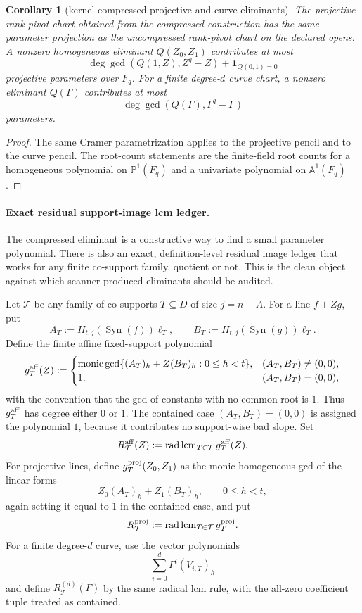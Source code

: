 \documentclass[11pt]{article}
\newtheorem{corollary}[corollary]{Corollary}
\theoremstyle{definition}
\theoremstyle{remark}
\newcommand{\Syn}{\operatorname{Syn}}
\begin{document}
\begin{corollary}[kernel-compressed projective and curve eliminants]
\label{cor:kernel-compressed-projective-curve-eliminants}
The projective rank-pivot chart obtained from the compressed construction has the
same parameter projection as the uncompressed rank-pivot chart on the declared
opens.  A nonzero homogeneous eliminant $Q(Z_0,Z_1)$ contributes at most
\[
        \deg\gcd(Q(1,Z),Z^q-Z)+\mathbf 1_{Q(0,1)=0}
\]
projective parameters over $F_q$.  For a finite degree-$d$ curve chart, a nonzero
eliminant $Q(\Gamma)$ contributes at most
\[
        \deg\gcd(Q(\Gamma),\Gamma^q-\Gamma)
\]
parameters.
\end{corollary}

\begin{proof}
The same Cramer parametrization applies to the projective pencil and to the
curve pencil.  The root-count statements are the finite-field root counts for a
homogeneous polynomial on $\mathbb P^1(F_q)$ and a univariate polynomial on
$\mathbb A^1(F_q)$.
\end{proof}

\paragraph{Exact residual support-image lcm ledger.}
The compressed eliminant is a constructive way to find a small parameter
polynomial.  There is also an exact, definition-level residual image ledger that
works for any finite co-support family, quotient or not.  This is the clean
object against which scanner-produced eliminants should be audited.

Let $\mathcal T$ be any family of co-supports $T\subseteq D$ of size $j=n-A$.
For a line $f+Zg$, put
\[
        A_T:=H_{t,j}(\Syn(f))\boldsymbol\ell_T,
        \qquad
        B_T:=H_{t,j}(\Syn(g))\boldsymbol\ell_T .
\]
Define the finite affine fixed-support polynomial
\[
        g_T^{\rm aff}(Z):=
        \begin{cases}
        \operatorname{monic}\gcd\{(A_T)_h+Z(B_T)_h:0\le h<t\},
             & (A_T,B_T)\ne(0,0),\\
        1,   & (A_T,B_T)=(0,0),
        \end{cases}
\]
with the convention that the gcd of constants with no common root is $1$.  Thus
$g_T^{\rm aff}$ has degree either $0$ or $1$.  The contained case
$(A_T,B_T)=(0,0)$ is assigned the polynomial $1$, because it contributes no
support-wise bad slope.
Set
\[
        R_{\mathcal T}^{\rm aff}(Z):=
        \operatorname{rad}\operatorname{lcm}_{T\in\mathcal T}g_T^{\rm aff}(Z).
\]
For projective lines, define $g_T^{\rm proj}(Z_0,Z_1)$ as the monic homogeneous
gcd of the linear forms
\[
        Z_0(A_T)_h+Z_1(B_T)_h,
        \qquad 0\le h<t,
\]
again setting it equal to $1$ in the contained case, and put
\[
        R_{\mathcal T}^{\rm proj}:=
        \operatorname{rad}\operatorname{lcm}_{T\in\mathcal T}g_T^{\rm proj}.
\]
For a finite degree-$d$ curve, use the vector polynomials
\[
        \sum_{i=0}^{d}\Gamma^i(V_{i,T})_h
\]
and define $R_{\mathcal T}^{(d)}(\Gamma)$ by the same radical lcm rule, with the
all-zero coefficient tuple treated as contained.
\end{document}
